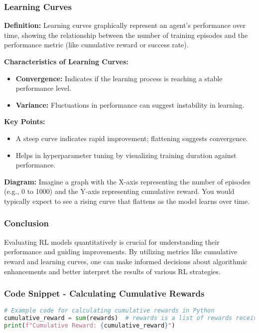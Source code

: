 \documentclass{beamer}
\begin{document}
\begin{frame}[fragile]
    \frametitle{Learning Curves}
    
    \textbf{Definition:} Learning curves graphically represent an agent's performance over time, showing the relationship between the number of training episodes and the performance metric (like cumulative reward or success rate).

    \textbf{Characteristics of Learning Curves:}
    \begin{itemize}
        \item \textbf{Convergence:} Indicates if the learning process is reaching a stable performance level.
        \item \textbf{Variance:} Fluctuations in performance can suggest instability in learning.
    \end{itemize}

    \textbf{Key Points:}
    \begin{itemize}
        \item A steep curve indicates rapid improvement; flattening suggests convergence.
        \item Helps in hyperparameter tuning by visualizing training duration against performance.
    \end{itemize}

    \textbf{Diagram:} Imagine a graph with the X-axis representing the number of episodes (e.g., 0 to 1000) and the Y-axis representing cumulative reward. You would typically expect to see a rising curve that flattens as the model learns over time.
\end{frame}

\begin{frame}[fragile]
    \frametitle{Conclusion}
    Evaluating RL models quantitatively is crucial for understanding their performance and guiding improvements. By utilizing metrics like cumulative reward and learning curves, one can make informed decisions about algorithmic enhancements and better interpret the results of various RL strategies.
\end{frame}

\begin{frame}[fragile]
    \frametitle{Code Snippet - Calculating Cumulative Rewards}
    \begin{lstlisting}[language=Python]
# Example code for calculating cumulative rewards in Python
cumulative_reward = sum(rewards)  # rewards is a list of rewards received over episodes
print(f"Cumulative Reward: {cumulative_reward}")
    \end{lstlisting}
\end{frame}
\end{document}
